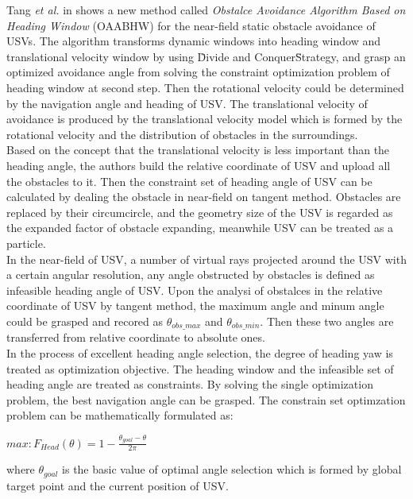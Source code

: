 \documentclass[12pt]{article}
\begin{document}
              Tang \textit{et al.} in \parencite{Tang2012} shows a new method called \textit{Obstalce Avoidance Algorithm Based on Heading Window} (OAABHW) for the near-field static obstacle avoidance of USVs. The algorithm transforms dynamic windows into heading window and translational velocity window by using \"Divide and Conquer\" Strategy, and grasp an optimized avoidance angle from solving the constraint optimization problem of heading window at second step. Then the rotational velocity could be determined by the navigation angle and heading of USV. The translational velocity of avoidance is produced by the translational velocity model which is formed by the rotational velocity and the distribution of obstacles in the surroundings.\\
              Based on the concept that the translational velocity is less important than the heading angle, the authors build the relative coordinate of USV and upload all the obstacles to it. Then the constraint set of heading angle of USV can be calculated by dealing the obstacle in near-field on tangent method. Obstacles are replaced by their circumcircle, and the geometry size of the USV is regarded as the expanded factor of obstacle expanding, meanwhile USV can be treated as a particle.\\
              In the near-field of USV, a number of virtual rays projected around the USV with a certain angular resolution, any angle obstructed by obstacles is defined as infeasible heading angle of USV. Upon the analysi of obstalces in the relative coordinate of USV by tangent method, the maximum angle and minum angle could be grasped and recored as $\theta_{obs\_max}$ and $\theta_{obs\_min}$. Then these two angles are transferred from relative coordinate to absolute ones.\\
              In the process of excellent heading angle selection, the degree of heading yaw is treated as optimization objective. The heading window and the infeasible set of heading angle are treated as constraints. By solving the single optimization problem, the best navigation angle can be grasped. The constrain set optimzation problem can be mathematically formulated as:
                  \begin{center}
                        $max: F_{Head} (\theta) = 1 - \frac{\theta_{goal} - \theta}{2\pi}$
                  \end{center}
              where $\theta_{goal}$ is the basic value of optimal angle selection which is formed by global target point and the current position of USV.\\
\end{document}

